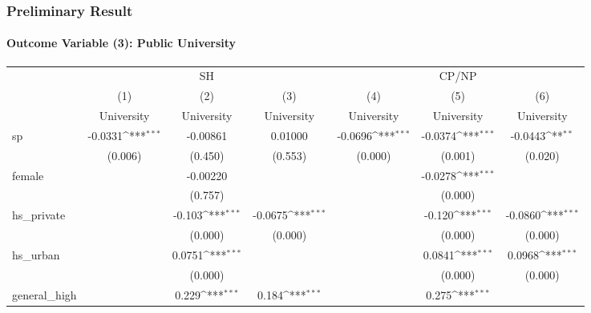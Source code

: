 \documentclass{beamer}
\def\sym#1{\ifmmode^{#1}\else\(^{#1}\)\fi}
\begin{document}
\begin{frame}[shrink=38] %
\frametitle{Preliminary Result}
\framesubtitle{Outcome Variable (3): Public University}

\centering
\begin{tabular}{l*{6}c}
    \toprule
    &\multicolumn{3}{c}{SH} &\multicolumn{3}{c}{CP/NP} \\
    \cmidrule(l){2-4}\cmidrule(l){5-7}
    &\multicolumn{1}{c}{(1)}&\multicolumn{1}{c}{(2)}&\multicolumn{1}{c}{(3)}&\multicolumn{1}{c}{(4)}&\multicolumn{1}{c}{(5)}&\multicolumn{1}{c}{(6)} \\
    &\multicolumn{1}{c}{University}&\multicolumn{1}{c}{University}&\multicolumn{1}{c}{University}&\multicolumn{1}{c}{University}&\multicolumn{1}{c}{University}&\multicolumn{1}{c}{University} \\
    \midrule
    sp          &     -0.0331\sym{***}&    -0.00861         &     0.01000         &     -0.0696\sym{***}&     -0.0374\sym{***}&     -0.0443\sym{**} \\
                &     (0.006)         &     (0.450)         &     (0.553)         &     (0.000)         &     (0.001)         &     (0.020)         \\
    [1em]
    female      &                     &    -0.00220         &                     &                     &     -0.0278\sym{***}&                     \\
                &                     &     (0.757)         &                     &                     &     (0.000)         &                     \\
    [1em]
    hs\_private  &                     &      -0.103\sym{***}&     -0.0675\sym{***}&                     &      -0.120\sym{***}&     -0.0860\sym{***}\\
                &                     &     (0.000)         &     (0.000)         &                     &     (0.000)         &     (0.000)         \\
    [1em]
    hs\_urban    &                     &      0.0751\sym{***}&                     &                     &      0.0841\sym{***}&      0.0968\sym{***}\\
                &                     &     (0.000)         &                     &                     &     (0.000)         &     (0.000)         \\
    [1em]
    general\_high&                     &       0.229\sym{***}&       0.184\sym{***}&                     &       0.275\sym{***}&                     \\

\end{tabular}
\end{frame}
\end{document}
